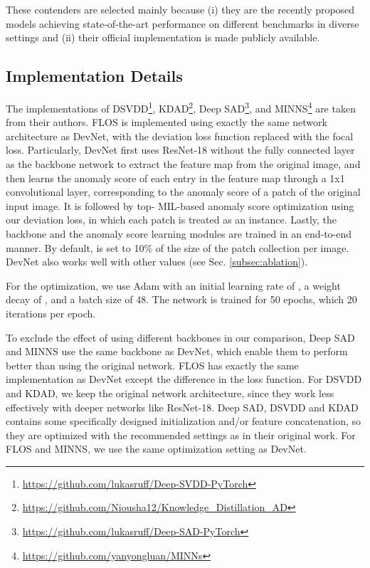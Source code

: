 \documentclass[10pt,journal,compsoc]{IEEEtran}
\begin{document}
These contenders are selected mainly because (i) they are the recently proposed models achieving state-of-the-art performance on different benchmarks in diverse settings and (ii) their official implementation is made publicly available.

\subsection{Implementation Details}

The implementations of DSVDD\footnote{\url{https://github.com/lukasruff/Deep-SVDD-PyTorch}}, KDAD\footnote{\url{https://github.com/Niousha12/Knowledge_Distillation_AD}}, Deep SAD\footnote{\url{https://github.com/lukasruff/Deep-SAD-PyTorch}}, and MINNS\footnote{\url{https://github.com/yanyongluan/MINNs}} are taken from their authors. FLOS is implemented using exactly the same network architecture as DevNet, with the deviation loss function replaced with the focal loss. Particularly, DevNet first uses ResNet-18 without the fully connected layer as the backbone network to extract the feature map from the original image, and then learns the anomaly score of each entry in the feature map through a 1x1 convolutional layer, corresponding to the anomaly score of a patch of the original input image. It is followed by top- MIL-based anomaly score optimization using our deviation loss, in which each patch is treated as an instance. Lastly, the backbone and the anomaly score learning modules are trained in an end-to-end manner. By default,  is set to 10\% of the size of the patch collection per image. DevNet also works well with other  values (see Sec. \ref{subsec:ablation}).

For the optimization, we use Adam \cite{kingma2014adam} with an initial learning rate of , a weight decay of , and a batch size of 48. The network is trained for 50 epochs, which 20 iterations per epoch.

To exclude the effect of using different backbones in our comparison, Deep SAD and MINNS use the same backbone as DevNet, which enable them to perform better than using the original network. FLOS has exactly the same implementation as DevNet except the difference in the loss function. For DSVDD and KDAD, we keep the original network architecture, since they work less effectively with deeper networks like ResNet-18. Deep SAD, DSVDD and KDAD contains some specifically designed initialization and/or feature concatenation, so they are optimized with the recommended settings as in their original work. For FLOS and MINNS, we use the same optimization setting as DevNet. 
\end{document}
